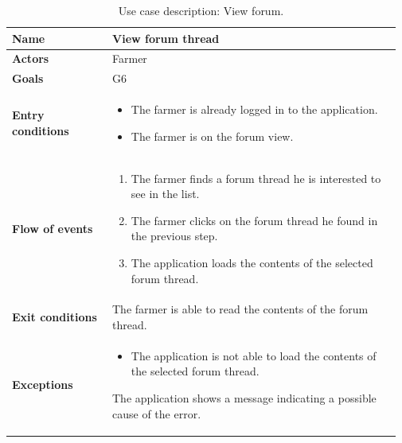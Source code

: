 \begin{table}[H]
    \centering
	\begin{tabular}{@{}p{0.25\linewidth} p{0.72\linewidth}@{}}
        \toprule
		\textbf{Name}               & View forum thread\\
		\midrule
		\textbf{Actors}             & Farmer\\
		\midrule
		\textbf{Goals}              & G6 \\
		\midrule
		
		\textbf{Entry conditions}   & \begin{itemize}[leftmargin=.4cm,noitemsep,topsep=0pt,before=\vspace{-3mm},after=\vspace{-4mm}]
		    \item The farmer is already logged in to the application.
		    \item The farmer is on the forum view.
		\end{itemize}\\
		\midrule
		
		\textbf{Flow of events}     & \begin{enumerate}[leftmargin=.4cm,noitemsep,topsep=0pt,before=\vspace{-3mm},after=\vspace{-4mm}]
		    \item The farmer finds a forum thread he is interested to see in the list.
		    \item The farmer clicks on the forum thread he found in the previous step.
		    \item The application loads the contents of the selected forum thread.
		\end{enumerate}\\
		\midrule
		\textbf{Exit conditions}    &  The farmer is able to read the contents of the forum thread. \\
		\midrule
		
		\textbf{Exceptions}         & 
	    \begin{itemize}[leftmargin=.4cm,noitemsep,topsep=0pt,before=\vspace{-3mm}]
		   \item The application is not able to load the contents of the selected forum thread.
		\end{itemize}
		The application shows a message indicating a possible cause of the error.
		\\\bottomrule
	\end{tabular}
	\caption{Use case description: View forum.} 
\end{table}

